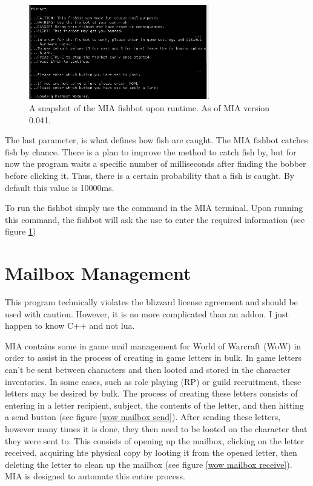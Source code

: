 \begin{figure}[h]
	\centering
	\includegraphics[width=0.7\textwidth]{images/fishbot_MIA.png}
	\caption{A snapshot of the MIA fishbot upon runtime. As of MIA version 0.041.} \label{fishbot terminal}
\end{figure}

The last parameter,  is what defines how fish are caught. The MIA fishbot catches fish by chance. There is a plan to improve the method to catch fish by, but for now the program waits a specific number of milliseconds after finding the bobber before clicking it. Thus, there is a certain probability that a fish is caught. By default this value is 10000ms.

To run the fishbot simply use the  command in the MIA terminal. Upon running this command, the fishbot will ask the use to enter the required information (see figure \ref{fishbot terminal})

\section{Mailbox Management} \label{WoWMailbox}

\begin{note}
	This program technically violates the blizzard license agreement and should be used with caution. However, it is no more complicated than an addon. I just happen to know C++ and not lua.
\end{note}

MIA contains some in game mail management for World of Warcraft (WoW) in order to assist in the process of creating in game letters in bulk. In game letters can't be sent between characters and then looted and stored in the character inventories. In some cases, such as role playing (RP) or guild recruitment, these letters may be desired by bulk. The process of creating these letters consists of entering in a letter recipient, subject, the contents of the letter, and then hitting a send button (see figure \ref{wow mailbox send}). After sending these letters, however many times it is done, they then need to be looted on the character that they were sent to. This consists of opening up the mailbox, clicking on the letter received, acquiring hte physical copy by looting it from the opened letter, then deleting the letter to clean up the mailbox (see figure \ref{wow mailbox receive}). MIA is designed to automate this entire process.

